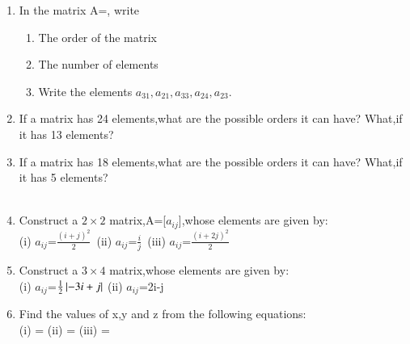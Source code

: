 
\renewcommand{\theequation}{\theenumi}
\begin{enumerate}[label=\arabic*.,ref=\thesubsection.\theenumi]
\item In the matrix A=, write
\begin{enumerate}
\item The order of the matrix
\item The number of elements
\item Write the elements $a_{31},a_{21},a_{33},a_{24},a_{23}.$
\end{enumerate}
\solution 


\item If a matrix has 24 elements,what are the possible orders it can have? What,if it has 13 elements?\\
\solution 

\item If a matrix has 18 elements,what are the possible orders it can have? What,if it has 5 elements?\\
\\
\solution 

%
\item Construct a $2 \times 2$ matrix,A=[$a_{ij}$],whose elements are given by:\\
(i) $a_{ij}$=$\frac{(i+j)^2}{2}$\ (ii) $a_{ij}$=$\frac{i}{j}$\ (iii) $a_{ij}$=$\frac{(i+2j)^2}{2}$\\
\solution 

\item Construct a $3\times 4$ matrix,whose elements are given by:\\
(i) $a_{ij}$=$\frac{1}{2}\left\vert-3i+j\right\vert$ (ii) $a_{ij}$=2i-j\\
\solution 

\item Find the values of x,y and z from the following equations:\\
(i)  =  (ii)  =  (iii) =\\

\end{enumerate}

